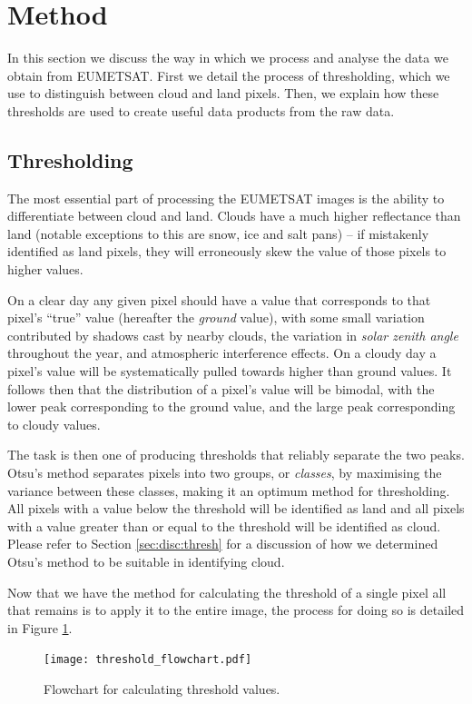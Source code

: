 \section{Method}
In this section we discuss the way in which we process and analyse the data we
obtain from EUMETSAT. First we detail the process of thresholding, which we use
to distinguish between cloud and land pixels. Then, we explain how these
thresholds are used to create useful data products from the raw data.

\subsection{Thresholding}
\label{sec:method:thr}
The most essential part of processing the EUMETSAT images is the ability to
differentiate between cloud and land. Clouds have a much higher reflectance than
land (notable exceptions to this are snow, ice and salt pans) -- if mistakenly
identified as land pixels, they will erroneously skew the value of those pixels
to higher values.

On a clear day any given pixel should have a value that corresponds to that
pixel's ``true'' value (hereafter the \emph{ground} value), with some small
variation contributed by shadows cast by nearby clouds, the variation in
\emph{solar zenith angle} throughout the year, and atmospheric interference
effects. On a cloudy day a pixel's value will be systematically pulled towards
higher than ground values. It follows then that the distribution of a pixel's
value will be bimodal, with the lower peak corresponding to the ground value,
and the large peak corresponding to cloudy values.

The task is then one of producing thresholds that reliably separate the two
peaks. Otsu's method \citep{gonzalez2008} separates pixels into two groups, or
\emph{classes}, by maximising the variance between these classes, making it an
optimum method for thresholding.  All pixels with a value below the threshold
will be identified as land and all pixels with a value greater than or equal to
the threshold will be identified as cloud. Please refer to Section
\ref{sec:disc:thresh} for a discussion of how we determined Otsu's method
to be suitable in identifying cloud.

Now that we have the method for calculating the threshold of a single
pixel all that remains is to apply it to the entire image, the process for doing
so is detailed in Figure \ref{fig:thr_fc}.
\begin{figure}[t!]
  \centering
  \texttt{[image: threshold\_flowchart.pdf]}
  \caption{Flowchart for calculating threshold values.}
  \label{fig:thr_fc}
\end{figure}

